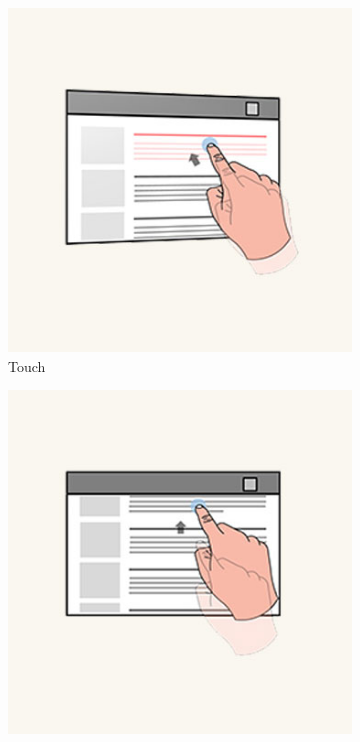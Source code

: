 \begin{enumerate}
    \begin{figure}[t]
        \centering
        \begin{subfigure}{0.3\textwidth}
            \centering
            \includegraphics[width=0.9\linewidth]{images/hololens_interaction_touch.jpg}
            \caption{Touch}\label{fig:hololensInteractionTouch}
        \end{subfigure}%
        \begin{subfigure}{0.3\textwidth}
            \centering
            \includegraphics[width=0.9\linewidth]{images/hololens_interaction_scroll.jpg}

\end{subfigure}
\end{figure}
\end{enumerate}
